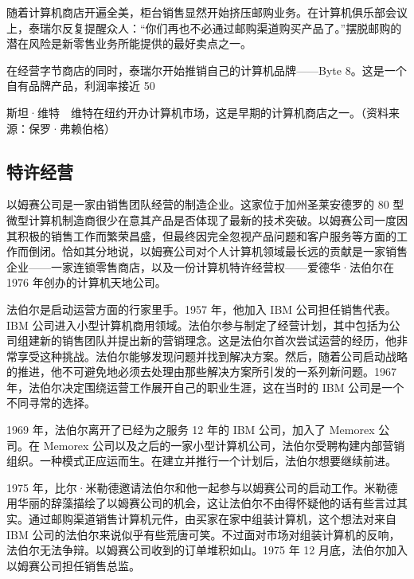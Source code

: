 \documentclass[12pt,UTF8]{ctexbook}
\begin{document}
随着计算机商店开遍全美，柜台销售显然开始挤压邮购业务。在计算机俱乐部会议上，泰瑞尔反复提醒众人：“你们再也不必通过邮购渠道购买产品了。”摆脱邮购的潜在风险是新零售业务所能提供的最好卖点之一。

在经营字节商店的同时，泰瑞尔开始推销自己的计算机品牌——Byte 8。这是一个自有品牌产品，利润率接近 50%



斯坦·维特　维特在纽约开办计算机市场，这是早期的计算机商店之一。（资料来源：保罗·弗赖伯格）





\subsection{特许经营}


以姆赛公司是一家由销售团队经营的制造企业。这家位于加州圣莱安德罗的 80 型微型计算机制造商很少在意其产品是否体现了最新的技术突破。以姆赛公司一度因其积极的销售工作而繁荣昌盛，但最终因完全忽视产品问题和客户服务等方面的工作而倒闭。恰如其分地说，以姆赛公司对个人计算机领域最长远的贡献是一家销售企业——一家连锁零售商店，以及一份计算机特许经营权——爱德华·法伯尔在 1976 年创办的计算机天地公司。

法伯尔是启动运营方面的行家里手。1957 年，他加入 IBM 公司担任销售代表。IBM 公司进入小型计算机商用领域。法伯尔参与制定了经营计划，其中包括为公司组建新的销售团队并提出新的营销理念。这是法伯尔首次尝试运营的经历，他非常享受这种挑战。法伯尔能够发现问题并找到解决方案。然后，随着公司启动战略的推进，他不可避免地必须去处理由那些解决方案所引发的一系列新问题。1967 年，法伯尔决定围绕运营工作展开自己的职业生涯，这在当时的 IBM 公司是一个不同寻常的选择。

1969 年，法伯尔离开了已经为之服务 12 年的 IBM 公司，加入了 Memorex 公司。在 Memorex 公司以及之后的一家小型计算机公司，法伯尔受聘构建内部营销组织。一种模式正应运而生。在建立并推行一个计划后，法伯尔想要继续前进。

1975 年，比尔·米勒德邀请法伯尔和他一起参与以姆赛公司的启动工作。米勒德用华丽的辞藻描绘了以姆赛公司的机会，这让法伯尔不由得怀疑他的话有些言过其实。通过邮购渠道销售计算机元件，由买家在家中组装计算机，这个想法对来自 IBM 公司的法伯尔来说似乎有些荒唐可笑。不过面对市场对组装计算机的反响，法伯尔无法争辩。以姆赛公司收到的订单堆积如山。1975 年 12 月底，法伯尔加入以姆赛公司担任销售总监。
\end{document}
